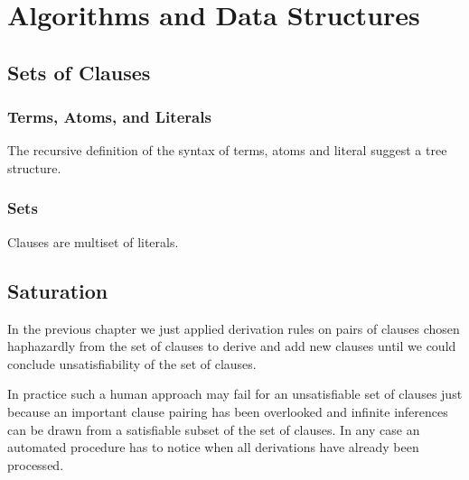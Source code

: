 
\chapter{Algorithms and Data Structures}

\section{Sets of Clauses}

\subsection{Terms, Atoms, and Literals}

The recursive definition of the syntax of terms, atoms and literal suggest a tree structure.



\subsection{Sets}

Clauses are multiset of literals.


\section{Saturation}

In the previous chapter we just applied derivation rules
on pairs of clauses chosen haphazardly from the set of clauses 
to derive and add new clauses 
until we could conclude unsatisfiability of the set of clauses.

In practice such a human approach may fail for an unsatisfiable set of clauses 
just because an important clause pairing has been overlooked 
and infinite inferences can be drawn from a satisfiable subset of the set of clauses.
In any case an automated procedure has to notice when all derivations have already been processed.


